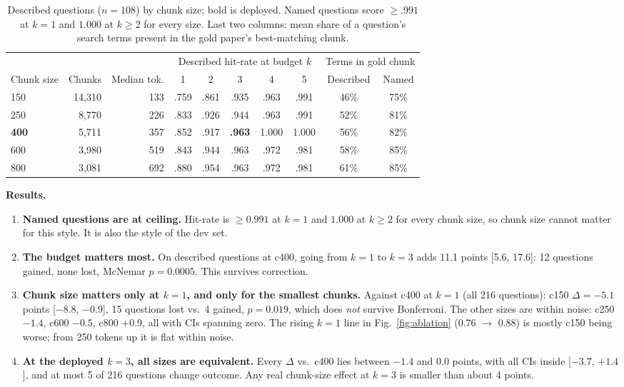 \documentclass[10pt,letterpaper]{article}
\begin{document}
\begin{table}[t]
  \centering\small
  \begin{tabular}{@{}lrr ccccc cc@{}}
    \toprule
    & & & \multicolumn{5}{c}{Described hit-rate at budget $k$} & \multicolumn{2}{c}{Terms in gold chunk} \\
    \cmidrule(lr){4-8}\cmidrule(l){9-10}
    Chunk size & Chunks & Median tok. & 1 & 2 & 3 & 4 & 5 & Described & Named \\
    \midrule
    150          & 14{,}310 & 133 & .759 & .861 & .935          & .963  & .991  & 46\% & 75\% \\
    250          &  8{,}770 & 226 & .833 & .926 & .944          & .963  & .991  & 52\% & 81\% \\
    \textbf{400} &  5{,}711 & 357 & .852 & .917 & \textbf{.963} & 1.000 & 1.000 & 56\% & 82\% \\
    600          &  3{,}980 & 519 & .843 & .944 & .963          & .972  & .981  & 58\% & 85\% \\
    800          &  3{,}081 & 692 & .880 & .954 & .963          & .972  & .981  & 61\% & 85\% \\
    \bottomrule
  \end{tabular}
  \caption{Described questions ($n{=}108$) by chunk size; bold is deployed. Named questions score
    ${\ge}.991$ at $k{=}1$ and $1.000$ at $k{\ge}2$ for every size. Last two columns: mean share of a
    question's search terms present in the gold paper's best-matching chunk.}
  \label{tab:ablation}
\end{table}

\textbf{Results.}
\begin{enumerate}
  \item \textbf{Named questions are at ceiling.} Hit-rate is ${\ge}0.991$ at $k{=}1$ and $1.000$
    at $k{\ge}2$ for every chunk size, so chunk size cannot matter for this style. It is also the
    style of the dev set.
  \item \textbf{The budget matters most.} On described questions at c400, going from $k{=}1$ to
    $k{=}3$ adds 11.1 points [5.6, 17.6]: 12 questions gained, none lost, McNemar $p = 0.0005$.
    This survives correction.
  \item \textbf{Chunk size matters only at $k{=}1$, and only for the smallest chunks.} Against
    c400 at $k{=}1$ (all 216 questions): c150 $\Delta = -5.1$ points [$-8.8$, $-0.9$], 15
    questions lost vs.\ 4 gained, $p = 0.019$, which does \emph{not} survive Bonferroni. The other
    sizes are within noise: c250 $-1.4$, c600 $-0.5$, c800 $+0.9$, all with CIs spanning zero.
    The rising $k{=}1$ line in Fig.~\ref{fig:ablation} (0.76 $\to$ 0.88) is mostly c150 being
    worse; from 250 tokens up it is flat within noise.
  \item \textbf{At the deployed $k{=}3$, all sizes are equivalent.} Every $\Delta$ vs.\ c400 lies
    between $-1.4$ and $0.0$ points, with all CIs inside [$-3.7$, $+1.4$], and at most 5 of 216
    questions change outcome. Any real chunk-size effect at $k{=}3$ is smaller than about 4
    points.
\end{enumerate}
\end{document}

